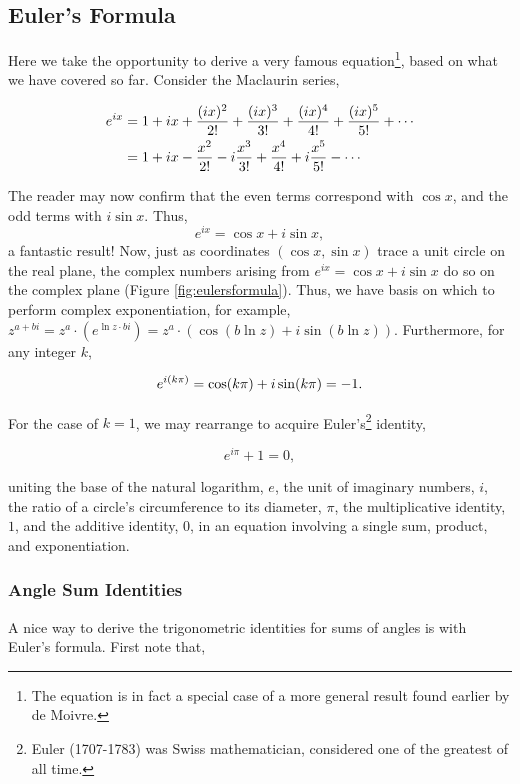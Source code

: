 \documentclass[11pt]{amsart}
\begin{document}
\subsection{Euler's Formula}

Here we take the opportunity to derive a very famous equation\footnote{The equation is in fact a special case of a more general result found earlier by de Moivre.}, based on what we have covered so far. Consider the Maclaurin series,

\begin{align}
e^{ix} &= 1 + ix + \frac{(ix)^2}{2!} + \frac{(ix)^3}{3!} + \frac{(ix)^4}{4!} + \frac{(ix)^5}{5!} + \cdots \notag \\
&= 1 + ix - \frac{x^2}{2!} - i\frac{x^3}{3!} + \frac{x^4}{4!} + i\frac{x^5}{5!} - \cdots \notag
\end{align}

The reader may now confirm that the even terms correspond with $\cos x$, and the odd terms with $i\sin x$. Thus, $$e^{ix} = \cos x + i\sin x,$$ a fantastic result! Now, just as coordinates $(\cos x, \sin x)$ trace a unit circle on the real plane, the complex numbers arising from $e^{ix} = \cos x + i\sin x$ do so on the complex plane (Figure \ref{fig:eulersformula}). Thus, we have basis on which to perform complex exponentiation, for example, $z^{a + bi} = z^a \cdot (e^{\ln z\cdot bi}) = z^a \cdot (\cos(b\ln z) + i\sin(b\ln z))$. Furthermore, for any integer $k$,

$$
e^{i(k\pi)} = \cos (k\pi) + i\sin (k\pi) \notag = -1.
$$

For the case of $k = 1$, we may rearrange to acquire Euler's\footnote{Euler (1707-1783) was Swiss mathematician, considered one of the greatest of all time.} identity,

$$
e^{i\pi} + 1 = 0,
$$

uniting the base of the natural logarithm, $e$, the unit of imaginary numbers, $i$, the ratio of a circle's circumference to its diameter, $\pi$, the multiplicative identity, $1$, and the additive identity, $0$, in an equation involving a single sum, product, and exponentiation.

\subsubsection{Angle Sum Identities}

A nice way to derive the trigonometric identities for sums of angles is with Euler's formula. First note that,
\end{document}

